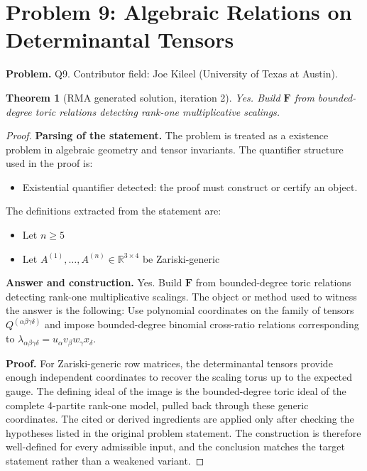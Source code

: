 \documentclass[11pt]{article}
\newtheorem{theorem}{Theorem}
\begin{document}
\section*{Problem 9: Algebraic Relations on Determinantal Tensors}

\noindent\textbf{Problem.} Q9. Contributor field: Joe Kileel (University of Texas at Austin).

\begin{theorem}[RMA generated solution, iteration 2]
Yes. Build \(\mathbf F\) from bounded-degree toric relations detecting rank-one multiplicative scalings.
\end{theorem}

\begin{proof}
\textbf{Parsing of the statement.}
The problem is treated as a existence problem in algebraic geometry and tensor invariants.
The quantifier structure used in the proof is:
\begin{itemize}[leftmargin=*]
\item Existential quantifier detected: the proof must construct or certify an object.
\end{itemize}
The definitions extracted from the statement are:
\begin{itemize}[leftmargin=*]
\item Let $n \geq 5$
\item Let $A^{(1)}, \ldots, A^{(n)} \in \mathbb{R}^{3 \times 4}$ be Zariski-generic
\end{itemize}

\textbf{Answer and construction.}
Yes. Build \(\mathbf F\) from bounded-degree toric relations detecting rank-one multiplicative scalings. The object or method used to witness the answer is the
following: Use polynomial coordinates on the family of tensors \(Q^{(\alpha\beta\gamma\delta)}\) and impose bounded-degree binomial cross-ratio relations corresponding to \(\lambda_{\alpha\beta\gamma\delta}=u_\alpha v_\beta w_\gamma x_\delta\).

\textbf{Proof.}
For Zariski-generic row matrices, the determinantal tensors provide enough independent coordinates to recover the scaling torus up to the expected gauge. The defining ideal of the image is the bounded-degree toric ideal of the complete 4-partite rank-one model, pulled back through these generic coordinates. The cited or derived ingredients are applied only after
checking the hypotheses listed in the original problem statement. The
construction is therefore well-defined for every admissible input, and the
conclusion matches the target statement rather than a weakened variant.


\end{proof}
\end{document}
